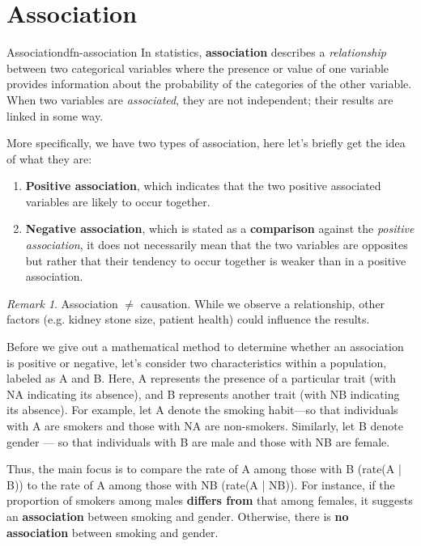 \documentclass[math,code]{amznotes}
\theoremstyle{remark}
\newtheorem*{remark}{Remark}
\begin{document}
\section{Association}
\begin{dfnbox}{Association}{dfn-association}
    In statistics, {\color{red} \textbf{association}} describes a \textit{relationship} between two categorical variables where the presence or value of one variable provides information about the probability of the categories of the other variable. When two variables are \textit{associated}, they are not independent; their results are linked in some way.
\end{dfnbox}
More specifically, we have two types of association, here let's briefly get the idea of what they are:
\begin{enumerate}
    \item \textbf{Positive association}, which indicates that the two positive associated variables are likely to occur together.
    \item \textbf{Negative association}, which is stated as a \textbf{comparison} against the \textit{positive association}, it does not necessarily mean that the two variables are opposites but rather that their tendency to occur together is weaker than in a positive association.
\end{enumerate}
\begin{notebox}
    \begin{remark}
        Association $\neq$ causation. While we observe a relationship, other factors (e.g. kidney stone size, patient health) could influence the results.
    \end{remark}
\end{notebox}

Before we give out a mathematical method to determine whether an association is positive or negative, let's consider two characteristics within a population, labeled as A and B. Here, A represents the presence of a particular trait (with NA indicating its absence), and B represents another trait (with NB indicating its absence). For example, let A denote the smoking habit—so that individuals with A are smokers and those with NA are non-smokers. Similarly, let B denote gender — so that individuals with B are male and those with NB are female.

Thus, the main focus is to compare the rate of A among those with B (rate(A | B)) to the rate of A among those with NB (rate(A | NB)). For instance, if the proportion of smokers among males \textbf{differs from} that among females, it suggests an \textbf{association} between smoking and gender. Otherwise, there is \textbf{no association} between smoking and gender.
\end{document}
